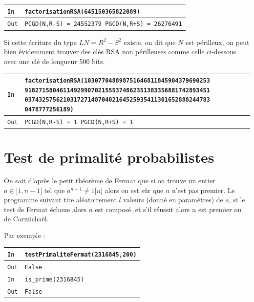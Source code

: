 \documentclass[titlepage]{article}
\begin{document}
    \begin{tabularx}{12cm}{|p{0.60cm}|X|}
        \hline
        \rowcolor{gray}
        \texttt{In}
        & 
        \texttt{factorisationRSA(645150365822089)}
        \\
        \hline
        \texttt{Out}
        &
        \texttt{PCGD(N,R-S) =  24552379 \newline
        PGCD(N,R+S) =  26276491}
        \\
        \hline
    \end{tabularx}
    \bigbreak
    
    Si cette écriture du type $LN = R^2 - S^2$ existe, on dit que $N$ est périlleux, on peut bien évidemment trouver des clés RSA non périlleuses comme celle ci-dessous avec une clé de longueur 500 bits.\bigbreak
    
    \begin{tabularx}{12cm}{|p{0.60cm}|X|}
        \hline
        \rowcolor{gray}
        \texttt{In}
        & 
        \texttt{factorisationRSA(103077048898751646811845904379690253
        91827158046114929907021555374862351383356881742893451
        03743257562103172714870402164525935411301652888244783
        0478777256189)}
        \\
        \hline
        \texttt{Out}
        &
        \texttt{PCGD(N,R-S) =  1 \newline
        PGCD(N,R+S) =  1}
        \\
        \hline
    \end{tabularx}
    \bigbreak
    

    \section{Test de primalité probabilistes}
    On sait d'après le petit théorème de Fermat que si on trouve un entier $a \in \lbrack1,n-1\rbrack$
    tel que $a^{n-1} \neq 1 \lbrack n \rbrack$ alors on est sûr que $n$ n'est pas premier. 
    Le programme suivant tire aléatoirement $l$ valeurs (donné en paramètres) de $a$, 
    si le test de Fermat échoue alors $n$ est composé, et s'il réussit alors $n$ est premier ou de Carmichaël.

    

    Par exemple : \bigbreak

    \begin{tabularx}{12cm}{|p{0.60cm}|X|}
        \hline
        \rowcolor{gray}
        \texttt{In}
        & 
        \texttt{testPrimaliteFermat(2316845,200)}
        \\
        \hline
        \texttt{Out}
        &
        \texttt{False}
        \\
        \hline
        \rowcolor{gray}
        \texttt{In}
        & 
        \texttt{is\_prime(2316845)}
        \\
        \hline
        \texttt{Out}
        &
        \texttt{False}
        \\
        \hline
    \end{tabularx}
    \bigbreak
\end{document}
